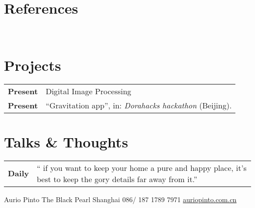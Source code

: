 \documentclass[lighthipster]{hipstercv}
\newlength{\rightcolwidth}
\begin{document}
\begin{paracol}{2}
\begin{minipage}[t]{0.3\textwidth}
\section*{References}
 \\

\end{minipage}\hfill
\begin{minipage}[t]{0.3\textwidth}
\section*{Projects}
\begin{tabular}{>{\footnotesize\bfseries}r >{\footnotesize}p{}}
    Present & {Digital Image Processing} \\
    Present & ``Gravitation app'', in: \emph{Dorahacks hackathon} (Beijing).
\end{tabular}
\bigskip

\section*{Talks & Thoughts}
\begin{tabular}{>{\footnotesize\bfseries}r >{\footnotesize}p{}}
    Daily & `` if you want to keep your home a pure and happy place, it’s best to keep the gory details far away from it.”
\end{tabular}
\end{minipage}









\vfill{} %

\setlength{\parindent}{0pt}
\begin{minipage}[t]{\rightcolwidth}
\begin{center}\fontfamily{\sfdefault}\selectfont \color{black!70}
{\small Aurio Pinto  The Black Pearl  Shanghai  086/ 187 1789 7971 \newline{} \protect\url{auriopinto.com.cn}
}
\end{center}
\end{minipage}


\end{paracol}
\end{document}
